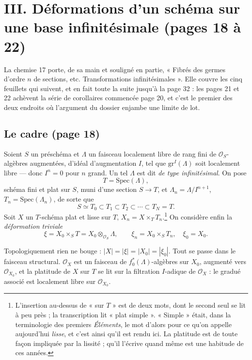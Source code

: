 \documentclass[11pt,a4paper]{article}
\begin{document}
\section*{III. Déformations d'un schéma sur une base infinitésimale (pages 18 à 22)}

La chemise 17 porte, de sa main et souligné en partie, « Fibrés des germes
d'ordre $n$ de sections, etc. Transformations infinitésimales ». Elle couvre
les cinq feuillets qui suivent, et en fait toute la suite jusqu'à la page 32 :
les pages 21 et 22 achèvent la série de corollaires commencée page 20, et
c'est le premier des deux endroits où l'argument du dossier enjambe une limite
de lot.

\subsection*{Le cadre (page 18)}

Soient $S$ un préschéma et $\Lambda$ un faisceau localement libre de rang fini
de $\mathcal{O}_{S}$-algèbres augmentées, d'idéal d'augmentation $I$, tel que
$\mathrm{gr}^{I}(\Lambda)$ soit localement libre — donc $I^{n} = 0$ pour $n$
grand. Un tel $\Lambda$ est dit \emph{de type infinitésimal}. On pose
\[
  T = \mathrm{Spec}(\Lambda) ,
\]
schéma fini et plat sur $S$, muni d'une section $S \to T$, et
$\Lambda_{n} = \Lambda/I^{n+1}$, $T_{n} = \mathrm{Spec}(\Lambda_{n})$, de sorte
que
\[
  S \simeq T_{0} \subset T_{1} \subset T_{2} \subset \cdots \subset T_{N} = T .
\]
Soit $X$ un $T$-schéma plat et lisse sur $T$, $X_{n} = X \times_{T}
T_{n}$.\footnote{L'insertion au-dessus de « sur $T$ » est de deux mots, dont le
second seul se lit à peu près ; la transcription lit « plat simple ». « Simple »
était, dans la terminologie des premiers \emph{Éléments}, le mot d'alors pour ce
qu'on appelle aujourd'hui \emph{lisse}, et c'est ainsi qu'il est rendu ici. La
platitude est de toute façon impliquée par la lissité ; qu'il l'écrive quand
même est une habitude de ces années.} On considère enfin la \emph{déformation
triviale}
\[
  \xi = X_{0} \times_{S} T = X_{0} \otimes_{\mathcal{O}_S} \Lambda ,
  \qquad \xi_{n} = X_{0} \times_{S} T_{n} , \quad \xi_{0} = X_{0} .
\]

Topologiquement rien ne bouge : $|X| = |\xi| = |X_{0}| = |\xi_{0}|$. Tout se
passe dans le faisceau structural. $\mathcal{O}_{X}$ est un faisceau de
$f_{0}^{*}(\Lambda)$-algèbres sur $X_{0}$, augmenté vers
$\mathcal{O}_{X_0}$, et la platitude de $X$ sur $T$ se lit sur la filtration
$I$-adique de $\mathcal{O}_{X}$ : le gradué associé est localement libre sur
$\mathcal{O}_{X_0}$.
\end{document}

